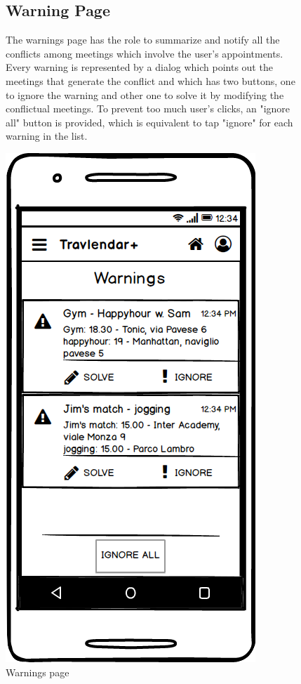 	\begin{figure}
			\begin{flushleft}
			\subsection{Warning Page}
			The warnings page has the role to summarize and notify all the conflicts among meetings which involve the user's appointments. Every warning is represented by a dialog which points out the meetings that generate the conflict and which has two buttons, one to ignore the warning and other one to solve it by modifying the conflictual meetings. 
			To prevent too much user's clicks, an "ignore all" button is provided, which is equivalent to tap "ignore" for each warning in the list. 
		\end{flushleft}
		\centering
		\includegraphics[width=0.6\linewidth]{mockups/Warnings}
		\caption{Warnings page}
		\label{fig:warnings}
	\end{figure}
\clearpage

